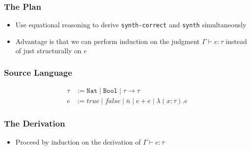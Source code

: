 \documentclass[usenames,dvipsnames]{beamer}
\newcommand{\Nat}{\texttt{Nat}}
\newcommand{\Bool}{\texttt{Bool}}
\begin{document}

\begin{frame}
  \frametitle{The Plan}

  \begin{itemize}
    \item Use equational reasoning to derive \texttt{synth-correct} and
      \texttt{synth} simultaneously

    \item Advantage is that we can perform induction on the judgment $\Gamma
      \vdash e : \tau$ instead of just structurally on $e$
  \end{itemize}
\end{frame}


\begin{frame}
  \frametitle{Source Language}

  \begin{align*}
    \tau &:= \Nat \mid \Bool \mid \tau \rightarrow \tau \\
    e &:= true \mid false \mid \overline{n} \mid e + e \mid \lambda (x:\tau).e
  \end{align*}
\end{frame}


\begin{frame}
  \frametitle{The Derivation}

  \begin{itemize}
    \item Proceed by induction on the derivation of $\Gamma \vdash e : \tau$
  \end{itemize}
\end{frame}

\end{document}
